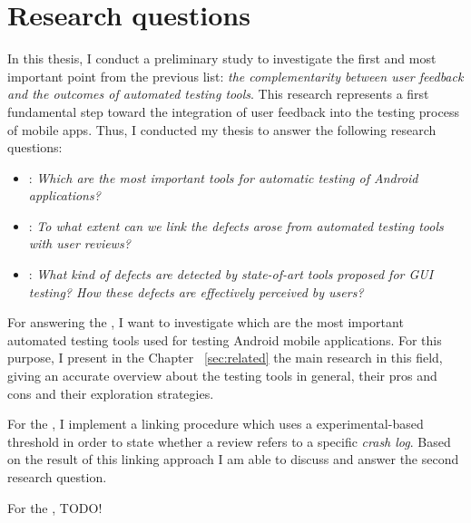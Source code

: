 \section{Research questions}
In this thesis, I conduct a preliminary study to investigate the first and most important point from the previous list: \textit{the complementarity between user feedback and the outcomes of automated testing tools}. This research represents a first fundamental step toward the integration of user feedback into the testing process of mobile apps. Thus, I conducted my thesis to answer the following research questions:

\begin{itemize}
	\item {}: \textit{Which are the most important tools for automatic testing of Android applications?} %
	
	\item {}: \textit{To what extent can we link the defects arose from automated testing tools with user reviews?}  
	
	\item {}: \textit{What kind of defects are detected by state-of-art tools proposed for GUI testing? How these defects are effectively perceived by users?} 

\end{itemize}
For answering the , I want to investigate which are the most important automated testing tools used for testing Android mobile applications. For this purpose, I present in the Chapter ~\ref{sec:related} the main research in this field, giving an accurate overview about the testing tools in general, their pros and cons and their exploration strategies. 

For the , I implement a linking procedure which uses a experimental-based threshold in order to state whether a review refers to a specific \textit{crash log}. Based on the result of this linking approach I am able to discuss and answer the second research question. 

For the , TODO!
